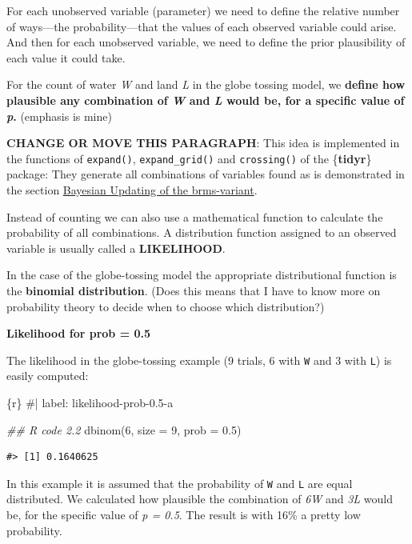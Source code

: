 \documentclass[
  letterpaper,
  DIV=11,
  numbers=noendperiod]{scrreprt}
\newenvironment{Shaded}{\begin{snugshade}}{\end{snugshade}}
\newcommand{\AttributeTok}[1]{\textcolor[rgb]{0.40,0.45,0.13}{#1}}
\newcommand{\CommentTok}[1]{\textcolor[rgb]{0.37,0.37,0.37}{#1}}
\newcommand{\DecValTok}[1]{\textcolor[rgb]{0.68,0.00,0.00}{#1}}
\newcommand{\DocumentationTok}[1]{\textcolor[rgb]{0.37,0.37,0.37}{\textit{#1}}}
\newcommand{\FloatTok}[1]{\textcolor[rgb]{0.68,0.00,0.00}{#1}}
\newcommand{\FunctionTok}[1]{\textcolor[rgb]{0.28,0.35,0.67}{#1}}
\newcommand{\InformationTok}[1]{\textcolor[rgb]{0.37,0.37,0.37}{#1}}
\newcommand{\NormalTok}[1]{\textcolor[rgb]{0.00,0.23,0.31}{#1}}
\begin{document}
For each unobserved variable (parameter) we need to define the relative
number of ways---the probability---that the values of each observed
variable could arise. And then for each unobserved variable, we need to
define the prior plausibility of each value it could take.

For the count of water \emph{W} and land \emph{L} in the globe tossing
model, we \textbf{define how plausible any combination of \emph{W} and
\emph{L} would be, for a specific value of \emph{p}.} (emphasis is mine)

\textbf{CHANGE OR MOVE THIS PARAGRAPH}: This idea is implemented in the
functions of \texttt{expand()}, \texttt{expand\_grid()} and
\texttt{crossing()} of the \{\textbf{tidyr}\} package: They generate all
combinations of variables found as is demonstrated in the section
\protect\hyperlink{sec-expand_grid}{Bayesian Updating of the
brms-variant}.

Instead of counting we can also use a mathematical function to calculate
the probability of all combinations. A distribution function assigned to
an observed variable is usually called a \textbf{LIKELIHOOD}.

In the case of the globe-tossing model the appropriate distributional
function is the \textbf{binomial distribution}. (Does this means that I
have to know more on probability theory to decide when to choose which
distribution?)

\textbf{Likelihood for prob = 0.5}

The likelihood in the globe-tossing example (9 trials, 6 with \texttt{W}
and 3 with \texttt{L}) is easily computed:

\begin{Shaded}
\begin{Highlighting}[]
\InformationTok{\textasciigrave{}\textasciigrave{}\textasciigrave{}\{r\}}
\CommentTok{\#| label: likelihood{-}prob{-}0.5{-}a}

\DocumentationTok{\#\# R code 2.2}
\FunctionTok{dbinom}\NormalTok{(}\DecValTok{6}\NormalTok{, }\AttributeTok{size =} \DecValTok{9}\NormalTok{, }\AttributeTok{prob =} \FloatTok{0.5}\NormalTok{)}
\InformationTok{\textasciigrave{}\textasciigrave{}\textasciigrave{}}
\end{Highlighting}
\end{Shaded}

\begin{verbatim}
#> [1] 0.1640625
\end{verbatim}

In this example it is assumed that the probability of \texttt{W} and
\texttt{L} are equal distributed. We calculated how plausible the
combination of \emph{6W} and \emph{3L} would be, for the specific value
of \emph{p = 0.5}. The result is with 16\% a pretty low probability.
\end{document}
